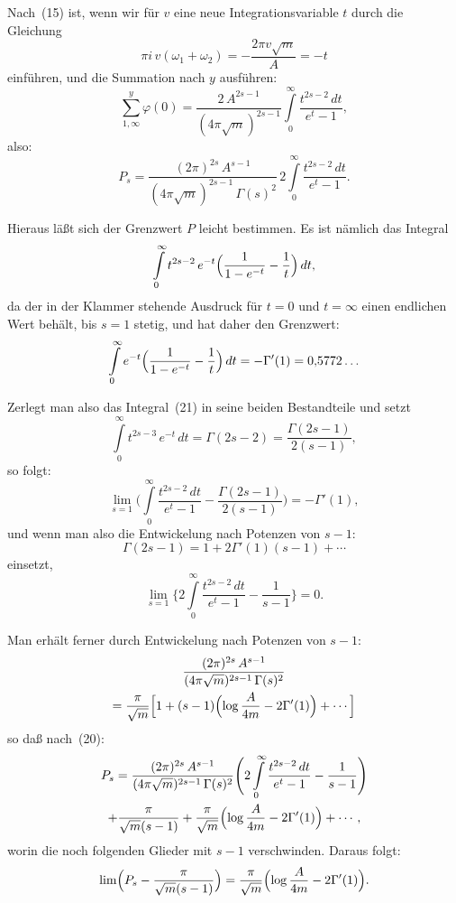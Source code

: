 \documentclass[12pt,a4paper]{article}
\theoremstyle{definition}
\begin{document}
Nach~(15) ist, wenn wir für $v$ eine neue Integrationsvariable $t$ durch 
die Gleichung
\[
\pi i\,v(\omega_{1} + \omega_{2}) = -\frac{2\pi v\sqrt{m}}{A} = -t
\]
einführen, und die Summation nach $y$ ausführen:
\[
\sum_{1,\infty}^{y} \varphi(0) =
\frac{2\,A^{2s-1}}{(4\pi\sqrt{m})^{2s-1}}
\int\limits_{0}^{\infty} \frac{t^{2s-2}\,dt}{e^{t}-1},
\]
also:
\begin{equation}
P_{s} = \frac{(2\pi)^{2s}\,A^{s-1}}{(4\pi\sqrt{m})^{2s-1}\,\Gamma(s)^{2}}
\,2\int\limits_{0}^{\infty} \frac{t^{2s-2}\,dt}{e^{t}-1}.
\end{equation}

Hieraus läßt sich der Grenzwert $P$ leicht bestimmen. Es ist nämlich das 
Integral
\begin{equation}
\int\limits_{0}^{\infty} t^{2s-2}\,e^{-t}
\Bigl(\frac{1}{1-e^{-t}} - \frac{1}{t}\Bigr)\,dt,
\end{equation}
da der in der Klammer stehende Ausdruck für $t = 0$ und $t = \infty$ einen 
endlichen Wert behält, bis $s = 1$ stetig, und hat daher den Grenzwert:
\[
\int\limits_{0}^{\infty} e^{-t}
\Bigl(\frac{1}{1-e^{-t}} - \frac{1}{t}\Bigr)\,dt = -\Gamma'(1) = 0{,}5772\ldots
\]

Zerlegt man also das Integral~(21) in seine beiden Bestandteile und setzt
\[
\int\limits_{0}^{\infty} t^{2s-3}\,e^{-t}\,dt = \Gamma(2s-2) =
\frac{\Gamma(2s-1)}{2(s-1)},
\]
so folgt:
\[
\lim_{s=1} \Biggl(\int\limits_{0}^{\infty}
\frac{t^{2s-2}\,dt}{e^{t}-1} - \frac{\Gamma(2s-1)}{2(s-1)}\Biggr) = -\Gamma'(1),
\]
und wenn man also die Entwickelung nach Potenzen von $s-1$:
\[
\Gamma(2s-1) = 1 + 2\Gamma'(1)(s-1) + \cdots
\]
einsetzt,
\begin{equation}
\lim_{s=1} \Biggl\{2\int\limits_{0}^{\infty}
\frac{t^{2s-2}\,dt}{e^{t}-1} - \frac{1}{s-1}\Biggr\} = 0.
\end{equation}

Man erhält ferner durch Entwickelung nach Potenzen von $s-1$:
\begin{multline}
\frac{(2\pi)^{2s}\,A^{s-1}}{(4\pi\sqrt{m})^{2s-1}\,\Gamma(s)^{2}}\\
= \frac{\pi}{\sqrt{m}}\Bigl[1 + (s-1)\Bigl(\log\frac{A}{4m} - 2\Gamma'(1)\Bigr)
+ \cdots\Bigr]
\end{multline}
so daß nach~(20):
\begin{multline}
P_{s} = \frac{(2\pi)^{2s}\,A^{s-1}}{(4\pi\sqrt{m})^{2s-1}\,\Gamma(s)^{2}}
\Biggl(2\int\limits_{0}^{\infty}\frac{t^{2s-2}\,dt}{e^{t}-1} - \frac{1}{s-1}\Biggr)\\
+ \frac{\pi}{\sqrt{m}(s-1)} + \frac{\pi}{\sqrt{m}}
\Bigl(\log\frac{A}{4m} - 2\Gamma'(1)\Bigr) + \cdots,
\end{multline}
worin die noch folgenden Glieder mit $s-1$ verschwinden. Daraus folgt:
\begin{equation}
\lim\Bigl(P_{s} - \frac{\pi}{\sqrt{m}(s-1)}\Bigr) =
\frac{\pi}{\sqrt{m}}\Bigl(\log\frac{A}{4m} - 2\Gamma'(1)\Bigr).
\end{equation}
\end{document}
